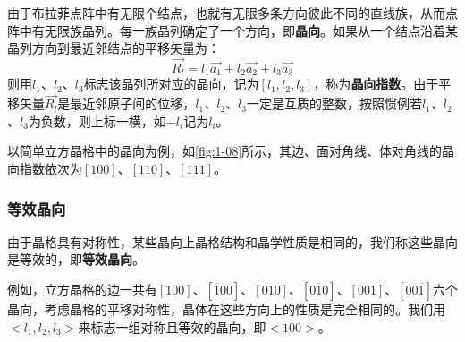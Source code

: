     由于布拉菲点阵中有无限个结点，也就有无限多条方向彼此不同的直线族，从而点阵中有无限族晶列。每一族晶列确定了一个方向，即\textbf{晶向}。如果从一个结点沿着某晶列方向到最近邻结点的平移矢量为：
    \[
        \vec{R_l}=l_1\vec{a_1}+l_2\vec{a_2}+l_3\vec{a_3}
    \]
    则用$l_1$、$l_2$、$l_3$标志该晶列所对应的晶向，记为$[l_1, l_2, l_3]$，称为\textbf{晶向指数}。由于平移矢量$\vec{R_l}$是最近邻原子间的位移，$l_1$、$l_2$、$l_3$一定是互质的整数，按照惯例若$l_1$、$l_2$、$l_3$为负数，则上标一横，如$-l_i$记为$\overline{l_i}$。

    以简单立方晶格中的晶向为例，如\autoref{fig:1-08}所示，其边、面对角线、体对角线的晶向指数依次为$[100]$、$[110]$、$[111]$。

\subsubsection{等效晶向}
    由于晶格具有对称性，某些晶向上晶格结构和晶学性质是相同的，我们称这些晶向是等效的，即\textbf{等效晶向}。

    例如，立方晶格的边一共有$[100]$、$[\overline{1}00]$、$[010]$、$[0\overline{1}0]$、$[001]$、$[00\overline{1}]$六个晶向，考虑晶格的平移对称性，晶体在这些方向上的性质是完全相同的。我们用$<l_1,l_2,l_3>$来标志一组对称且等效的晶向，即$<100>$。


